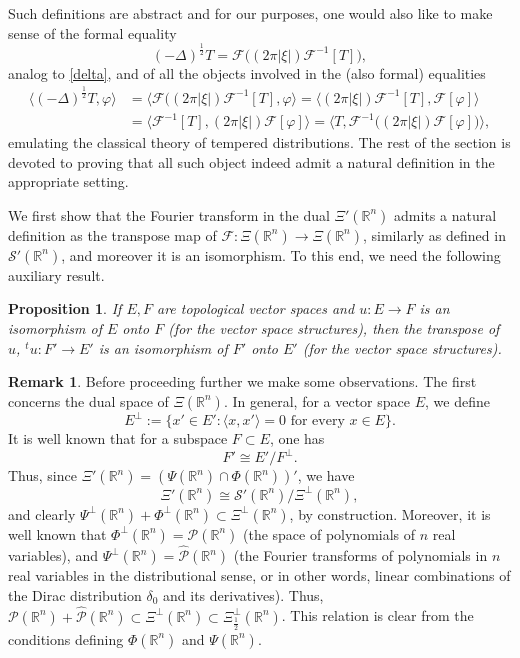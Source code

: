 \documentclass[reqno,11pt]{amsart}
\newtheorem{proposition}[theorem]{Proposition}
\theoremstyle{definition}
\newtheorem{remark}[theorem]{Remark}
\def\R{\mathbb{R}}
\begin{document}
Such definitions are abstract and for our purposes, one would also like to make sense of the formal equality
\begin{equation*}
(-\Delta)^\frac{1}{2}T=\mathcal{F}\big((2 \pi  |\xi|)\mathcal{F}^{-1}[T]\big),
\end{equation*}
analog to \eqref{delta}, and of all the objects involved in the (also formal) equalities
	\begin{align}
	\big\langle (-\Delta)^{\frac{1}{2}}T ,\varphi  \big\rangle & = 	\big\langle \mathcal{F}\big((2 \pi |\xi|)\mathcal{F}^{-1}[T] ,\varphi  \big\rangle = 	\big\langle (2 \pi |\xi|)\mathcal{F}^{-1}[T] ,\mathcal{F}[\varphi ] \big\rangle \nonumber \\
	& = \big\langle \mathcal{F}^{-1}[T] ,(2 \pi  |\xi|)\mathcal{F}[\varphi ] \big\rangle = \big\langle T , \mathcal{F}^{-1} \big( (2 \pi |\xi|)\mathcal{F}[\varphi ]\big) \big\rangle,\label{EQchaineq}
\end{align}
emulating the classical theory of tempered distributions. The rest of the section is devoted to proving that all such object indeed admit a natural definition in the appropriate setting.


We first show that the Fourier transform in the dual $\Xi'(\R^n)$ admits a natural definition as the transpose map of $\mathcal{F}:\Xi(\R^n)\to\Xi(\R^n)$, similarly as defined in $\mathcal{S}'(\R^n)$, and moreover it is an isomorphism. To this end, we need the following auxiliary result.


\begin{proposition}\label{PROPisom}\cite[Proposition 23.1]{treves}
	If $E,F$ are topological vector spaces and $u:E\to F$ is an isomorphism of $E$ onto $F$ (for the vector space structures), then the transpose of $u$, $^{t}u:F'\to E'$ is an isomorphism of $F'$ onto $E'$ (for the vector space structures).
\end{proposition}

\begin{remark}
	\label{REMperp}
Before proceeding further we make some observations. The first concerns the dual space of $\Xi(\R^n)$. In general, for a vector space $E$, we define
\[
E^\perp := \{ x'\in E': \langle x,x'\rangle=0\text{ for every }x\in E \}.
\]
It is well known that for a subspace $F\subset E$, one has
\[
F' \cong E'/F^\perp.
\]
Thus, since $\Xi'(\R^n)=(\Psi(\R^n)\cap \Phi(\R^n))'$, we have
\[
\Xi'(\R^n) \cong \mathcal{S}'(\R^n)/\Xi^\perp(\R^n),
\]
and clearly $\Psi^\perp(\R^n)+\Phi^\perp(\R^n)\subset \Xi^\perp(\R^n)$, by construction. Moreover, it is well known that $\Phi^\perp(\R^n)=\mathcal{P}(\R^n)$ (the space of polynomials of $n$ real variables), and $\Psi^\perp(\R^n) = \widehat{\mathcal{P}}(\R^n)$ (the Fourier transforms of polynomials in $n$ real variables in the distributional sense, or in other words, linear combinations of the Dirac distribution $\delta_0$ and its derivatives). Thus, $\mathcal{P}(\R^n)+\widehat{\mathcal{P}}(\R^n)\subset \Xi^\perp(\R^n)\subset\Xi_{\frac{1}{2}}^\perp(\R^n)$. This relation is clear from the conditions defining $\Phi(\R^n)$  and $\Psi(\R^n)$.
\end{remark}
\end{document}
